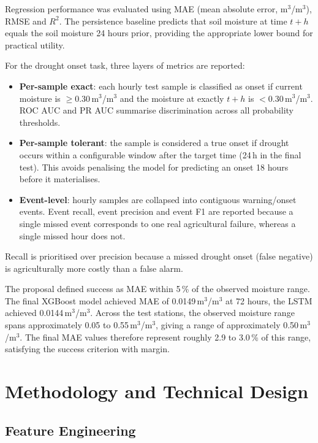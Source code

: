 \documentclass[12pt, a4paper]{article}
\begin{document}
Regression performance was evaluated using MAE (mean absolute error,
m$^3$/m$^3$), RMSE and $R^2$. The persistence baseline predicts that soil
moisture at time $t+h$ equals the soil moisture 24 hours prior, providing the
appropriate lower bound for practical utility.

For the drought onset task, three layers of metrics are reported:
\begin{itemize}
  \item \textbf{Per-sample exact}: each hourly test sample is classified as
        onset if current moisture is $\geq 0.30$\,m$^3$/m$^3$ and the moisture
        at exactly $t+h$ is $< 0.30$\,m$^3$/m$^3$. ROC AUC and PR AUC
        summarise discrimination across all probability thresholds.
  \item \textbf{Per-sample tolerant}: the sample is considered a true onset
        if drought occurs within a configurable window after the target time
        (24\,h in the final test). This avoids penalising the model for
        predicting an onset 18 hours before it materialises.
  \item \textbf{Event-level}: hourly samples are collapsed into contiguous
        warning/onset events. Event recall, event precision and event F1 are
        reported because a single missed event corresponds to one real
        agricultural failure, whereas a single missed hour does not.
\end{itemize}
Recall is prioritised over precision because a missed drought onset (false
negative) is agriculturally more costly than a false alarm.

The proposal defined success as MAE within 5\,\% of the observed moisture range.
The final XGBoost model achieved MAE of 0.0149\,m$^3$/m$^3$ at 72 hours, the
LSTM achieved 0.0144\,m$^3$/m$^3$. Across the test stations, the observed
moisture range spans approximately 0.05 to 0.55\,m$^3$/m$^3$, giving a range
of approximately 0.50\,m$^3$/m$^3$. The final MAE values therefore represent
roughly 2.9 to 3.0\,\% of this range, satisfying the success criterion with
margin.

\section{Methodology and Technical Design}

\subsection{Feature Engineering}
\end{document}

